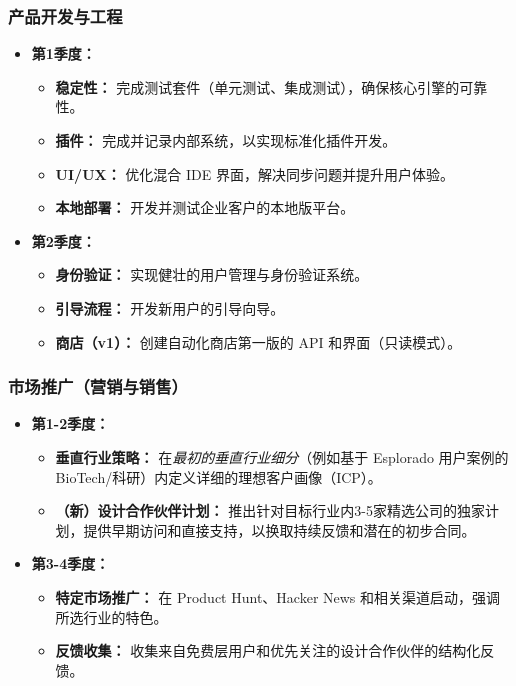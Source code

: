 \documentclass[11点, A4纸, 单面]{article}
\begin{document}
\subsubsection{产品开发与工程}
\begin{itemize}[leftmargin=*]
    \item \textbf{第1季度：}
    \begin{itemize}
        \item \textbf{稳定性：} 完成测试套件（单元测试、集成测试），确保核心引擎的可靠性。
        \item \textbf{插件：} 完成并记录内部系统，以实现标准化插件开发。
        \item \textbf{UI/UX：} 优化混合 IDE 界面，解决同步问题并提升用户体验。
        \item \textbf{本地部署：} 开发并测试企业客户的本地版平台。
    \end{itemize}
    \item \textbf{第2季度：}
    \begin{itemize}
        \item \textbf{身份验证：} 实现健壮的用户管理与身份验证系统。
        \item \textbf{引导流程：} 开发新用户的引导向导。
        \item \textbf{商店（v1）：} 创建自动化商店第一版的 API 和界面（只读模式）。
    \end{itemize}
\end{itemize}

\subsubsection{市场推广（营销与销售）}
\begin{itemize}[leftmargin=*]
    \item \textbf{第1-2季度：}
    \begin{itemize}
        \item \textbf{垂直行业策略：} 在\textit{最初的垂直行业细分}（例如基于 Esplorado 用户案例的 BioTech/科研）内定义详细的理想客户画像（ICP）。
        \item \textbf{（新）设计合作伙伴计划：} 推出针对目标行业内3-5家精选公司的独家计划，提供早期访问和直接支持，以换取持续反馈和潜在的初步合同。
    \end{itemize}
    \item \textbf{第3-4季度：}
    \begin{itemize}
        \item \textbf{特定市场推广：} 在 Product Hunt、Hacker News 和相关渠道启动，强调所选行业的特色。
        \item \textbf{反馈收集：} 收集来自免费层用户和优先关注的设计合作伙伴的结构化反馈。
    \end{itemize}
\end{itemize}
\end{document}
